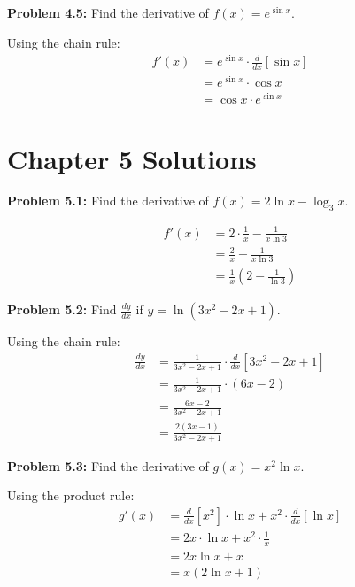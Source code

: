 \documentclass[12pt,a4paper]{book}
\theoremstyle{definition}
\begin{document}
\begin{solution}
\textbf{Problem 4.5:} Find the derivative of $f(x) = e^{\sin x}$.

Using the chain rule:
\begin{align}
f'(x) &= e^{\sin x} \cdot \frac{d}{dx}[\sin x]\\
&= e^{\sin x} \cdot \cos x\\
&= \cos x \cdot e^{\sin x}
\end{align}
\end{solution}

\section*{Chapter 5 Solutions}

\begin{solution}
\textbf{Problem 5.1:} Find the derivative of $f(x) = 2\ln x - \log_3 x$.

\begin{align}
f'(x) &= 2 \cdot \frac{1}{x} - \frac{1}{x \ln 3}\\
&= \frac{2}{x} - \frac{1}{x \ln 3}\\
&= \frac{1}{x}\left(2 - \frac{1}{\ln 3}\right)
\end{align}
\end{solution}

\begin{solution}
\textbf{Problem 5.2:} Find $\frac{dy}{dx}$ if $y = \ln(3x^2 - 2x + 1)$.

Using the chain rule:
\begin{align}
\frac{dy}{dx} &= \frac{1}{3x^2 - 2x + 1} \cdot \frac{d}{dx}[3x^2 - 2x + 1]\\
&= \frac{1}{3x^2 - 2x + 1} \cdot (6x - 2)\\
&= \frac{6x - 2}{3x^2 - 2x + 1}\\
&= \frac{2(3x - 1)}{3x^2 - 2x + 1}
\end{align}
\end{solution}

\begin{solution}
\textbf{Problem 5.3:} Find the derivative of $g(x) = x^2 \ln x$.

Using the product rule:
\begin{align}
g'(x) &= \frac{d}{dx}[x^2] \cdot \ln x + x^2 \cdot \frac{d}{dx}[\ln x]\\
&= 2x \cdot \ln x + x^2 \cdot \frac{1}{x}\\
&= 2x \ln x + x\\
&= x(2\ln x + 1)
\end{align}
\end{solution}
\end{document}

